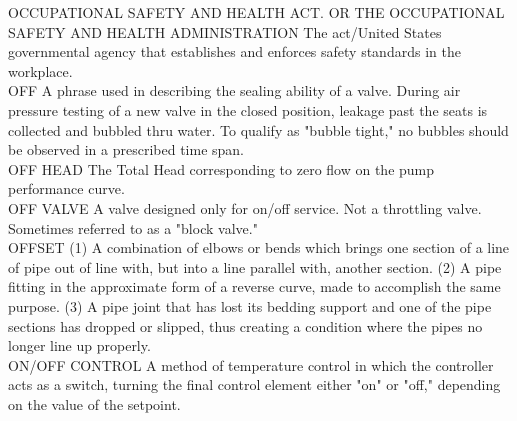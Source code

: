 \documentclass{article}
\begin{document}
OCCUPATIONAL SAFETY AND HEALTH ACT. OR THE OCCUPATIONAL SAFETY AND HEALTH ADMINISTRATION
The act/United States governmental agency that establishes and enforces safety standards in the workplace.
\vspace{0.3cm}\\

OFF
A phrase used in describing the sealing ability of a valve. During air pressure testing of a new valve in the closed position, leakage past the seats is collected and bubbled thru water. To qualify as "bubble tight," no bubbles should be observed in a prescribed time span.
\vspace{0.3cm}\\
OFF HEAD
The Total Head corresponding to zero flow on the pump performance curve.
\vspace{0.3cm}\\
OFF VALVE
A valve designed only for on/off service. Not a throttling valve. Sometimes referred to as a "block valve."
\vspace{0.3cm}\\
OFFSET
(1) A combination of elbows or bends which brings one section of a line of pipe out of line with, but into a line parallel with, another section. (2) A pipe fitting in the approximate form of a reverse curve, made to accomplish the same purpose. (3) A pipe joint that has lost its bedding support and one of the pipe sections has dropped or slipped, thus creating a condition where the pipes no longer line up properly. 
\vspace{0.3cm}\\
ON/OFF CONTROL
A method of temperature control in which the controller acts as a switch, turning the final control element either "on" or "off," depending on the value of the setpoint.
\vspace{0.3cm}\\
\end{document}
